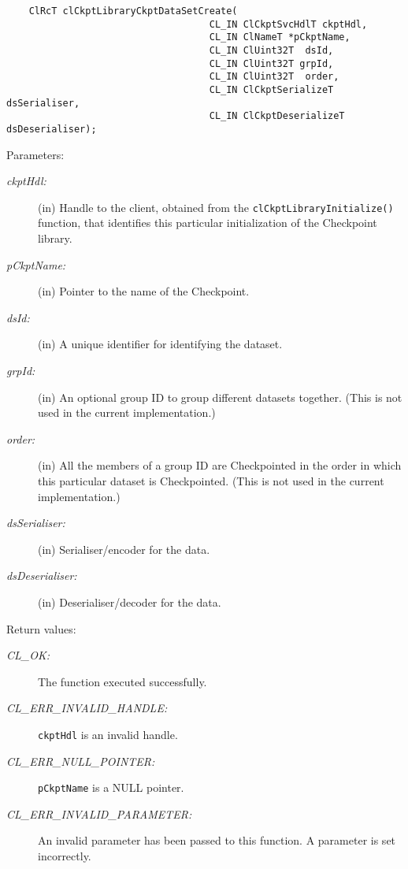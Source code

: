 \begin{flushleft}
\begin{Desc}
\footnotesize\begin{verbatim}    ClRcT clCkptLibraryCkptDataSetCreate(
                              		CL_IN ClCkptSvcHdlT ckptHdl,
                              		CL_IN ClNameT *pCkptName,
                              		CL_IN ClUint32T  dsId,
                              		CL_IN ClUint32T grpId,
                              		CL_IN ClUint32T  order,
                              		CL_IN ClCkptSerializeT dsSerialiser,
                              		CL_IN ClCkptDeserializeT dsDeserialiser);
\end{verbatim}
\normalsize
\end{Desc}
\begin{Desc}
\item[Parameters:]
\begin{description}
\item[{\em ckpt\-Hdl:}](in) Handle to the client, obtained from the {\tt{clCkptLibraryInitialize()}} function, that identifies this particular 
initialization of the Checkpoint library. 
\item[{\em p\-Ckpt\-Name:}](in) Pointer to the name of the Checkpoint. 
\item[{\em ds\-Id:}](in) A unique identifier for identifying the dataset. 
\item[{\em grp\-Id:}](in) An optional group ID to group different datasets together. (This is not used in the current implementation.) 
\item[{\em order:}](in) All the members of a group ID are Checkpointed in the order in which this particular dataset is Checkpointed. 
(This is not used in the current implementation.) 
\item[{\em ds\-Serialiser:}](in) Serialiser/encoder for the data. 
\item[{\em ds\-Deserialiser:}](in) Deserialiser/decoder for the data.\end{description}
\end{Desc}
\begin{Desc}
\item[Return values:]
\begin{description}
\item[{\em CL\_\-OK:}]The function executed successfully. 
\item[{\em CL\_\-ERR\_\-INVALID\_\-HANDLE:}]{\tt{ckptHdl}} is an invalid handle.
\item[{\em CL\_\-ERR\_\-NULL\_\-POINTER:}]{\tt{pCkptName}} is a NULL pointer. 
\item[{\em CL\_\-ERR\_\-INVALID\_\-PARAMETER:}]An invalid parameter has been passed to this function. A parameter is set incorrectly.

\end{description}
\end{Desc}
\end{flushleft}
